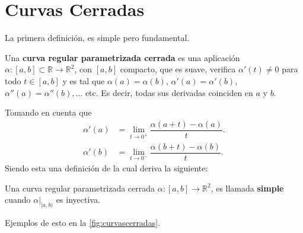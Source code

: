\documentclass[oneside,11pt]{memoir}
\begin{document}
\section{Curvas Cerradas}
La primera definición, es simple pero fundamental. 
\begin{definition}
    Una \textbf{curva regular parametrizada cerrada} es una aplicación $\alpha:[a,b]\subset \mathbb{R}\to\mathbb{R}^2$, con $[a,b]$ compacto, que es suave, verifica $\alpha'(t)\neq 0$ para todo $t\in [a,b]$ y es tal que $\alpha(a)=\alpha(b)$,  $\alpha'(a)=\alpha'(b)$, $\alpha''(a)=\alpha''(b),\ldots$ etc. Es decir, todas sus derivadas coinciden en $a$ y $b$. 
\end{definition}
Tomando en cuenta que 
\begin{align*}
   \alpha'(a)&=\lim_{t\to 0^+}\dfrac{\alpha(a+t)-\alpha(a)}{t}. \\
   \alpha'(b)&=\lim_{t\to 0^-}\dfrac{\alpha(b+t)-\alpha(b)}{t}. 
\end{align*}
Siendo esta una definición de la cual deriva la siguiente:
\begin{definition}
    Una curva regular parametrizada cerrada $\alpha:[a,b]\to\mathbb{R}^2$, es llamada \textbf{simple} cuando $\left.\alpha\right|_{[a,b)}$ es inyectiva.
\end{definition}
Ejemplos de esto en la \ref{fig:curvascerradas}.
\end{document}
